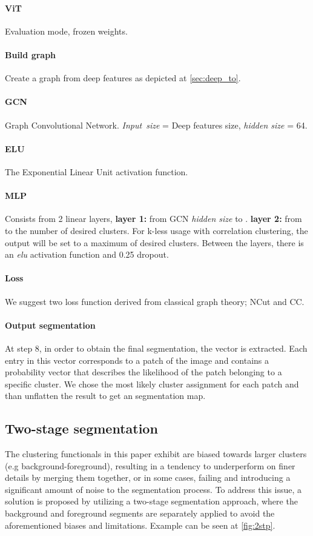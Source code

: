 \documentclass[10pt,twocolumn,letterpaper]{article}
\begin{document}
\paragraph{ViT} Evaluation mode, frozen weights.

\paragraph{Build graph} Create a graph from deep features as depicted at \cref{sec:deep_to}.

\paragraph{GCN} Graph Convolutional Network\cite{kipf2016semi}. \emph{Input\ size} = Deep features size, \emph{hidden size} = 64.

\paragraph{ELU} The Exponential Linear Unit activation function.
\paragraph{MLP} Consists from 2 linear layers, \textbf{layer 1:} from GCN \emph{hidden size} to . \textbf{layer 2:} from  to  the number of desired clusters. For k-less usage with correlation clustering, the output will be set to a maximum of desired clusters. Between the layers, there is an \emph{elu} activation function and 0.25 dropout.

 \paragraph{Loss} We suggest two loss function derived from classical graph theory; NCut and CC.

\paragraph{Output segmentation} At step 8, in order to obtain the final segmentation, the vector  is extracted. Each entry in this vector corresponds to a patch of the image and contains a probability vector that describes the likelihood of the patch belonging to a specific cluster. We chose the most likely cluster assignment for each patch and than unflatten the result to get an segmentation map. 

\subsection{Two-stage segmentation}
The clustering functionals in this paper exhibit are biased towards larger clusters (e.g background-foreground), resulting in a tendency to underperform on finer details by merging them together, or in some cases, failing and introducing a significant amount of noise to the segmentation process. To address this issue, a solution is proposed by utilizing a two-stage segmentation approach, where the background and foreground segments are separately applied to avoid the aforementioned biases and limitations. Example can be seen at \cref{fig:2stp}.
\end{document}
